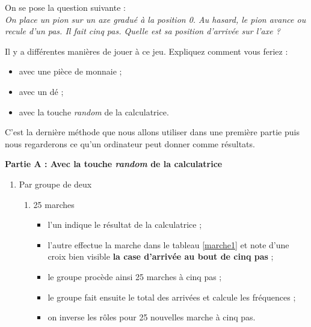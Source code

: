 \begin{act}\label{fluctuact2}
On se pose la question suivante :\\
\emph{On place un pion sur un axe gradu\'e \`a la position 0. Au hasard, le pion avance ou recule d'un pas. Il fait cinq pas. Quelle est sa position d'arriv\'ee sur l'axe ?}\newline

Il y a diff\'erentes mani\`eres de jouer \`a ce jeu. Expliquez comment vous feriez :
\vspace{-1em}\begin{multicols}{3}
\begin{itemize}
	\item avec une pi\`ece de monnaie ;\sautcol
	\item avec un d\'e ;\sautcol
	\item avec la touche \emph{random} de la calculatrice.
\end{itemize}
\end{multicols}

C'est la derni\`ere m\'ethode que nous allons utiliser dans une premi\`ere partie puis nous regarderons ce qu'un ordinateur peut donner comme r\'esultats.\newline

\noindent \textbf{Partie A : Avec la touche \emph{random} de la calculatrice}

\begin{enumerate}
	\item Par groupe de deux

				\begin{enumerate}
					\item 25 marches
						 \begin{itemize}
									\item l'un indique le r\'esultat de la calculatrice ;
									\item l'autre effectue la marche dans le tableau \ref{marche1}  et note d'une croix bien visible \textbf{la case d'arriv\'ee au bout de cinq pas} ;
									\item le groupe proc\`ede ainsi 25 marches \`a cinq pas ;
									\item le groupe fait ensuite le total des arriv\'ees et calcule les fr\'equences ;
									\item on inverse les rôles pour 25 nouvelles marche \`a cinq pas.
								\end{itemize}




\end{enumerate}
\end{enumerate}
\end{act}
